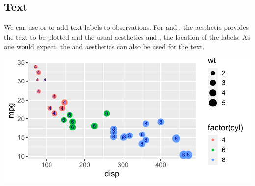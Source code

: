 \documentclass[krantz2]{krantz}\usepackage{knitr}
\begin{document}
\subsection{Text}\label{sec:plot:text}
We can use  or  to add text labels to observations. For  and , the aesthetic  provides the text to be plotted and the usual aesthetics  and , the location of the labels. As one would expect, the  and  aesthetics can also be used for the text.

\begin{knitrout}\footnotesize
{}\color{fgcolor}\begin{kframe}
\begin{alltt}
\hlstd{(}  \hlstd{(}   
                           \hlstd{=} 
                           
                            \hlopt{+}
  \hlstd{()} \hlopt{+}
  \hlstd{()} \hlopt{+}
  \hlstd{(} \hlstd{=} \hlstd{,}  \hlstd{=} \hlstd{)}
\end{alltt}
\end{kframe}

{\centering \includegraphics[width=.7\textwidth]{figure/pos-text-plot-01-1}

}



\end{knitrout}
\end{document}
